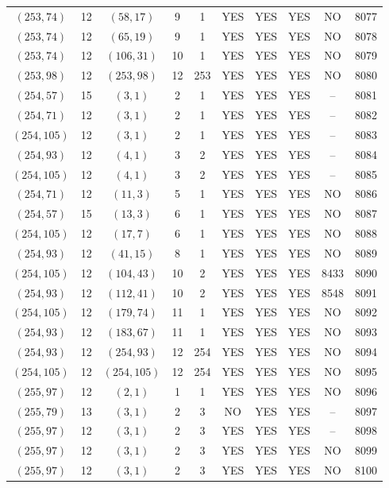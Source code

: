 \begin{longtable}{|c|c|c|c|c|c|c|c|c|c|}
$(253, 74)$ & 12 & $(58, 17)$ & 9 & 1 & YES & YES & YES & NO & 8077\\
$(253, 74)$ & 12 & $(65, 19)$ & 9 & 1 & YES & YES & YES & NO & 8078\\
$(253, 74)$ & 12 & $(106, 31)$ & 10 & 1 & YES & YES & YES & NO & 8079\\
$(253, 98)$ & 12 & $(253, 98)$ & 12 & 253 & YES & YES & YES & NO & 8080\\
$(254, 57)$ & 15 & $(3, 1)$ & 2 & 1 & YES & YES & YES & -- & 8081\\
$(254, 71)$ & 12 & $(3, 1)$ & 2 & 1 & YES & YES & YES & -- & 8082\\
$(254, 105)$ & 12 & $(3, 1)$ & 2 & 1 & YES & YES & YES & -- & 8083\\
$(254, 93)$ & 12 & $(4, 1)$ & 3 & 2 & YES & YES & YES & -- & 8084\\
$(254, 105)$ & 12 & $(4, 1)$ & 3 & 2 & YES & YES & YES & -- & 8085\\
$(254, 71)$ & 12 & $(11, 3)$ & 5 & 1 & YES & YES & YES & NO & 8086\\
$(254, 57)$ & 15 & $(13, 3)$ & 6 & 1 & YES & YES & YES & NO & 8087\\
$(254, 105)$ & 12 & $(17, 7)$ & 6 & 1 & YES & YES & YES & NO & 8088\\
$(254, 93)$ & 12 & $(41, 15)$ & 8 & 1 & YES & YES & YES & NO & 8089\\
$(254, 105)$ & 12 & $(104, 43)$ & 10 & 2 & YES & YES & YES & 8433 & 8090\\
$(254, 93)$ & 12 & $(112, 41)$ & 10 & 2 & YES & YES & YES & 8548 & 8091\\
$(254, 105)$ & 12 & $(179, 74)$ & 11 & 1 & YES & YES & YES & NO & 8092\\
$(254, 93)$ & 12 & $(183, 67)$ & 11 & 1 & YES & YES & YES & NO & 8093\\
$(254, 93)$ & 12 & $(254, 93)$ & 12 & 254 & YES & YES & YES & NO & 8094\\
$(254, 105)$ & 12 & $(254, 105)$ & 12 & 254 & YES & YES & YES & NO & 8095\\
$(255, 97)$ & 12 & $(2, 1)$ & 1 & 1 & YES & YES & YES & NO & 8096\\
$(255, 79)$ & 13 & $(3, 1)$ & 2 & 3 & NO & YES & YES & -- & 8097\\
$(255, 97)$ & 12 & $(3, 1)$ & 2 & 3 & YES & YES & YES & -- & 8098\\
$(255, 97)$ & 12 & $(3, 1)$ & 2 & 3 & YES & YES & YES & NO & 8099\\
$(255, 97)$ & 12 & $(3, 1)$ & 2 & 3 & YES & YES & YES & NO & 8100\\

\end{longtable}
